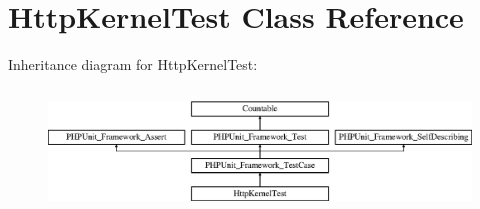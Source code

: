 \section{Http\+Kernel\+Test Class Reference}
\label{class_symfony_1_1_component_1_1_http_kernel_1_1_tests_1_1_http_kernel_test}
Inheritance diagram for Http\+Kernel\+Test\+:\begin{figure}[H]
\begin{center}
\leavevmode
\includegraphics[height=3.303835cm]{class_symfony_1_1_component_1_1_http_kernel_1_1_tests_1_1_http_kernel_test}
\end{center}
\end{figure}
